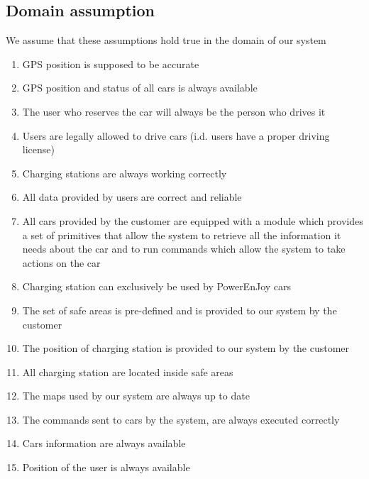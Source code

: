 \subsection{Domain assumption}
	We assume that these assumptions hold true in the domain of our system 
	\begin{enumerate}[label=\textbf{DA\arabic*}]
		\item GPS position is supposed to be accurate
		\item GPS position and status of all cars is always available
		\item The user who reserves the car will always be the person who drives it
		\item Users are legally allowed to drive cars (i.d. users have a proper driving license)
		\item Charging stations are always working correctly
		\item All data provided by users are correct and reliable
		\item All cars provided by the customer are equipped with a module which provides a set of
		primitives that allow the system to retrieve all the information it needs about
		the car and to run commands which allow the system to take actions on the car
		\item Charging station can exclusively be used by PowerEnJoy cars
		\item The set of safe areas is pre-defined and is provided to our system by the customer
		\item The position of charging station is provided to our system by the customer
		\item All charging station are located inside safe areas
		\item The maps used by our system are always up to date
		\item The commands sent to cars by the system, are always executed
		correctly
		\item Cars information are always available
		\item Position of the user is always available
		
	\end{enumerate}